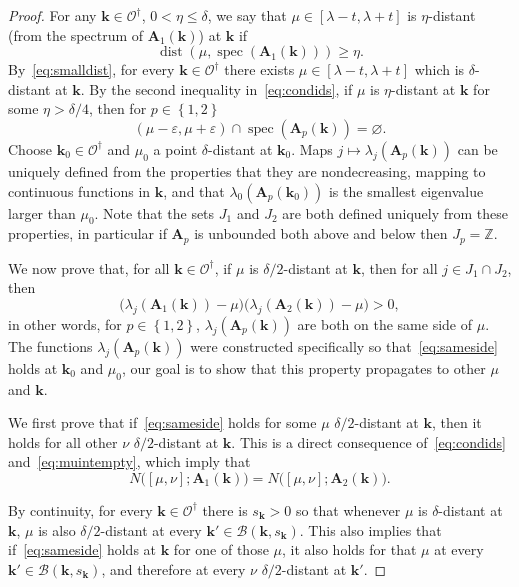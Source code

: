 \documentclass[AHL,Unicode,longabstracts,published]{cedram}
\DeclareMathOperator{\spec}{spec}
\DeclareMathOperator{\dist}{dist}
\newcommand{\Z}{\mathbb Z}
\newcommand{\CB}{\mathcal{B}}
\newcommand{\CO}{\mathcal{O}}
\newcommand{\BA}{\mathbf A}
\newcommand{\bk}{\mathbf k}
\newcommand{\eps}{\varepsilon}
\newcommand{\set}[1]{\left\{ #1 \right\}}
\begin{document}
\begin{proof}
For any $\bk \in \CO^\dagger$, $0 < \eta \le \delta$, we say that $\mu \in [\lambda - t,
\lambda + t]$ is $\eta$-distant (from the spectrum of $\BA_1(\bk)$) at $\bk$ if
\begin{equation}\label{eq:choicemu}
\dist(\mu,\spec(\BA_1(\bk))) \ge \eta.
\end{equation}
By~\eqref{eq:smalldist}, for every $\bk \in \CO^\dagger$ there exists $\mu \in [\lambda - t, \lambda + t]$ which is $\delta$-distant at $\bk$. By the second inequality in~\eqref{eq:condids}, if $\mu$ is $\eta$-distant at $\bk$ for some $\eta > \delta/4$, then for $p \in \set{1,2}$
\begin{equation}\label{eq:muintempty}
(\mu - \eps,\mu + \eps) \cap \spec(\BA_p(\bk)) = \varnothing.
\end{equation}
Choose $\bk_0 \in \CO^\dagger$ and $\mu_0$ a point $\delta$-distant at $\bk_0$. Maps $j \mapsto \lambda_j(\BA_p(\bk))$ can be uniquely defined from the properties that they are nondecreasing, mapping to continuous functions in $\bk$, and that $\lambda_0(\BA_p(\bk_0))$ is the smallest eigenvalue larger than $\mu_0$. Note that the sets $J_1$ and $J_2$ are both defined uniquely from these properties, in particular if $\BA_p$ is unbounded both above and below then $J_p = \Z$.

We now prove that, for all $\bk \in \CO^\dagger$, if $\mu$ is $\delta/2$-distant at $\bk$, then for all $j \in J_1 \cap J_2$, then
\begin{equation}\label{eq:sameside}
\big(\lambda_j(\BA_1(\bk)) - \mu\big) \big(\lambda_j(\BA_2(\bk)) - \mu\big) > 0,
\end{equation}
in other words, for $p \in \set{1,2}$, $\lambda_j(\BA_p(\bk))$ are both on the same side of $\mu$. The functions $\lambda_j(\BA_p(\bk))$ were constructed specifically so that~\eqref{eq:sameside} holds at $\bk_0$ and $\mu_0$, our goal is to show that this property propagates to other $\mu$ and $\bk$.

We first prove that if~\eqref{eq:sameside} holds for some $\mu$ $\delta/2$-distant at $\bk$, then it holds for all other $\nu$ $\delta/2$-distant at $\bk$. This is a direct consequence of~\eqref{eq:condids} and~\eqref{eq:muintempty}, which imply that
\begin{equation}
N\big([\mu,\nu];\BA_1(\bk)\big) = N\big([\mu,\nu];\BA_2(\bk)\big).
\end{equation}

By continuity, for every $\bk \in \CO^\dagger$ there is $s_\bk > 0$ so that whenever $\mu$ is $\delta$-distant at $\bk$, $\mu$ is also $\delta/2$-distant at every $\bk' \in \CB(\bk,s_\bk)$. This also implies that if~\eqref{eq:sameside} holds at $\bk$ for one of those $\mu$, it also holds for that $\mu$ at every $\bk' \in \CB(\bk,s_\bk)$, and therefore at every $\nu$ $\delta/2$-distant at $\bk'$.


\end{proof}
\end{document}
